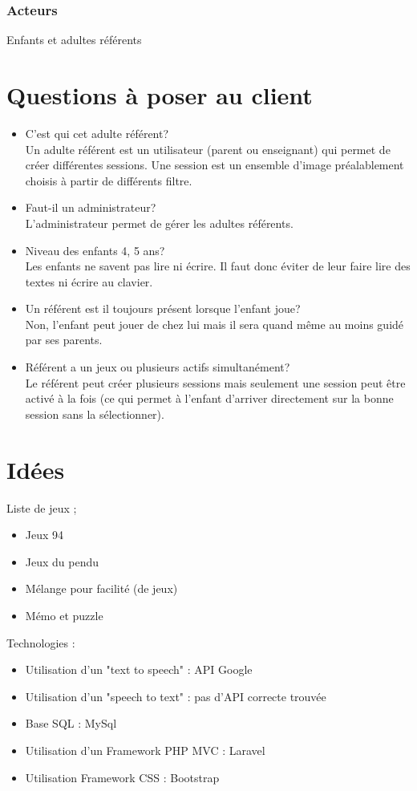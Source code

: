 \documentclass[12pt,a4paper]{report}
\begin{document}
\subsection{Acteurs}
Enfants et adultes référents
\chapter{Questions à poser au client}
\begin{itemize}
\item C'est qui cet adulte référent?\\
Un adulte référent est un utilisateur (parent ou enseignant) qui permet de créer différentes sessions. Une session est un ensemble d'image préalablement choisis à partir de différents filtre.
\item Faut-il un administrateur?\\
L'administrateur permet de gérer les adultes référents.
\item Niveau des enfants 4, 5 ans?\\
Les enfants ne savent pas lire ni écrire. Il faut donc éviter de leur faire lire des textes ni écrire au clavier.
\item Un référent est il toujours présent lorsque l'enfant joue?\\
Non, l'enfant peut jouer de chez lui mais il sera quand même au moins guidé par ses parents.
\item Référent a un jeux ou plusieurs actifs simultanément?\\
Le référent peut créer plusieurs sessions mais seulement une session peut être activé à la fois (ce qui permet à l'enfant d'arriver directement sur la bonne session sans la sélectionner).
\end{itemize}
\chapter{Idées}
Liste de jeux ;
\begin{itemize}
\item Jeux 94
\item Jeux du pendu
\item Mélange pour facilité (de jeux)
\item Mémo et puzzle
\end{itemize}

\medbreak
Technologies :
\begin{itemize}
\item Utilisation d'un "text to speech" : API Google
\item Utilisation d'un "speech to text" : pas d'API correcte trouvée
\item Base SQL : MySql
\item Utilisation d'un Framework PHP MVC : Laravel
\item Utilisation Framework CSS : Bootstrap
\end{itemize}
\end{document}
